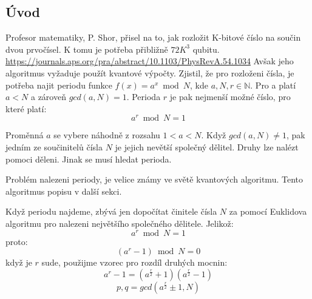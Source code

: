 \documentclass[11pt]{article}
\begin{document}
\subsection{Úvod}
Profesor matematiky, P. Shor, přisel na to, jak rozložit K-bitové číslo na součin dvou prvočísel.
K tomu je potřeba přibližně $72K^3$ qubitu.
\url{https://journals.aps.org/pra/abstract/10.1103/PhysRevA.54.1034}
Avšak jeho algoritmus vyžaduje použít kvantové výpočty. Zjistil, že pro rozloženi čísla,
je potřeba najit periodu funkce $f(x) = a^x \bmod N$, kde $a, N, r \in \mathbb{N}$.
Pro a platí $a < N$ a zároveň $gcd(a, N) = 1$.
Perioda $r$ je pak nejmenší možné číslo, pro které platí:
$$a^r \bmod N = 1$$
\par Proměnná $a$ se vybere náhodně z rozsahu $1 < a < N$.
Když $gcd(a, N) \ne 1$, pak jedním ze součinitelů čísla $N$ je jejich nevětší společný dělitel.
Druhy lze nalézt pomoci děleni. Jinak se musí hledat perioda.
\par Problém nalezeni periody, je velice známy ve světě kvantových algoritmu. Tento algoritmus popisu v další sekci.
\par Když periodu najdeme, zbývá jen dopočítat činitele čísla $N$ za pomocí Euklidova algoritmu pro nalezeni největšího společného dělitele.
Jelikož:
$$a^r \bmod N = 1$$
proto:
$$(a^r - 1) \bmod N = 0$$
když je $r$ sude, použijme vzorec pro rozdíl druhých mocnin:
$$a^r - 1 = (a^\frac{r}{2} + 1)(a^\frac{r}{2} - 1)$$
$$p, q = gcd(a^\frac{r}{2} \pm 1, N)$$
\end{document}
